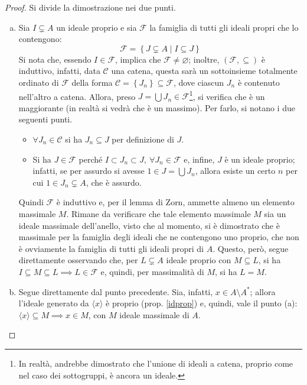 \documentclass[12pt]{scrartcl}
\theoremstyle{style}
\numberwithin{equation}{subsection}
\begin{document}
	\begin{proof}
		Si divide la dimostrazione nei due punti.
		\begin{enumerate}[(a).]
			\item Sia $I \subsetneq A$ un ideale proprio e sia $\mathcal{F} $ la famiglia di tutti gli ideali propri che lo contengono:
				\[
				\mathcal{F} =\left\{ J\subsetneq A  \mid I \subseteq J \right\} 
				\] 
				Si nota che, essendo $I \in \mathcal{F} $, implica che $\mathcal{F } \neq \varnothing$; inoltre, $(\mathcal{F} ,\subseteq )$ \`e induttivo, infatti, data $\mathcal{C} $ una catena, questa sar\`a un sottoinsieme totalmente ordinato di $\mathcal{F} $ della forma $\mathcal{C} =\left\{ J_n \right\} \subseteq \mathcal{F} $, dove ciascun $J_n$ \`e contenuto nell'altro a catena.
				Allora, preso $J = \bigcup J_n \in \mathcal{F} $\footnote{In realt\`a, andrebbe dimostrato che l'unione di ideali a catena, proprio come nel caso dei sottogruppi, \`e ancora un ideale.}, si verifica che \`e un maggiorante (in realt\`a si vedr\`a che \`e un massimo).
				Per farlo, si notano i due seguenti punti.
				\begin{itemize}
					\item $\forall J_n \in \mathcal{C} $ si ha $ J_n\subseteq J$ per definizione di $J$.
					\item Si ha $J \in \mathcal{F} $ perch\'e $I \subset J_n \subset J, \ \forall J_n \in \mathcal{F} $ e, infine, $J$ \`e un ideale proprio; infatti, se per assurdo si avesse $1 \in  J = \bigcup J_n$, allora esiste un certo $n$ per cui $1 \in J_n \subsetneq A$, che \`e assurdo.
				\end{itemize}
				Quindi $\mathcal{F} $ \`e induttivo e, per il lemma di Zorn, ammette almeno un elemento massimale $M$.
Rimane da verificare che tale elemento massimale $M$ sia un ideale massimale dell'anello, visto che al momento, si \`e dimostrato che \`e massimale per la famiglia degli ideali che ne contengono uno proprio, che non \`e ovviamente la famiglia di tutti gli ideali propri di $A$.
Questo, per\`o, segue direttamente osservando che, per $L \subsetneq A$ ideale proprio con $M \subseteq L$, si ha $I \subseteq M \subseteq L \implies L \in \mathcal{F} $ e, quindi, per massimalit\`a di $M$, si ha $L = M$.
\item Segue direttamente dal punto precedente.
	Sia, infatti, $x \in A \setminus A^*$; allora l'ideale generato da $\langle x \rangle$ \`e proprio (prop. \ref{idprop}) e, quindi, vale il punto (a): $\langle x \rangle\subseteq M \implies x \in M$, con $M$ ideale massimale di $A$.
		\end{enumerate}
	\end{proof}
\end{document}
